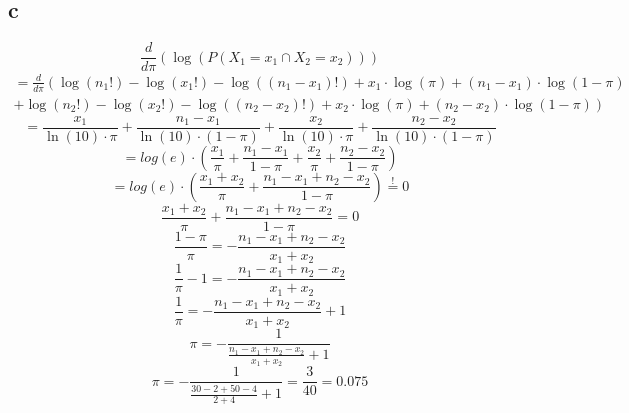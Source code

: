 \subsection{c}
\[ \frac{d}{d\pi}\left(\log(P(X_1=x_1 \cap X_2 = x_2))\right) \]
\[ \begin{array}{l} 
= \frac{d}{d\pi}\left( 
\log(n_1!) 
- \log(x_1!) 
- \log((n_1 - x_1)!) 
+ x_1 \cdot \log(\pi) 
+ (n_1 - x_1) \cdot \log(1-\pi) \right.\\\left.
+ \log(n_2!) 
- \log(x_2!) 
- \log((n_2 - x_2)!) 
+ x_2 \cdot \log(\pi) 
+ (n_2 - x_2) \cdot \log(1-\pi) \right)
\end{array} \]
%
\[ = \frac{x_1}{\ln(10) \cdot \pi} + \frac{n_1 - x_1}{\ln(10) \cdot (1 - \pi)}
+ \frac{x_2}{\ln(10) \cdot \pi} + \frac{n_2 - x_2}{\ln(10) \cdot (1 - \pi)} \]
\[ = log(e) \cdot \left( 
\frac{x_1}{\pi} 
+ \frac{n_1 - x_1}{1 - \pi}
+ \frac{x_2}{\pi} 
+ \frac{n_2 - x_2}{1 - \pi} \right) \]
\[ = log(e) \cdot \left( 
\frac{x_1 + x_2}{\pi} 
+ \frac{n_1 - x_1 + n_2 - x_2}{1 - \pi} \right) \stackrel{!}{=} 0 \]
\[ \frac{x_1 + x_2}{\pi} + \frac{n_1 - x_1 + n_2 - x_2}{1 - \pi} = 0 \]
\[ \frac{1 - \pi}{\pi} = - \frac{n_1 - x_1 + n_2 - x_2}{x_1 + x_2} \]
\[ \frac{1}{\pi} -1 = - \frac{n_1 - x_1 + n_2 - x_2}{x_1 + x_2} \]
\[ \frac{1}{\pi} = - \frac{n_1 - x_1 + n_2 - x_2}{x_1 + x_2} + 1 \]
\[ \pi = -\frac{1}{\frac{n_1 - x_1 + n_2 - x_2}{x_1 + x_2} + 1} \]
\[ \pi = -\frac{1}{\frac{30 - 2 + 50 - 4}{2 + 4} + 1} = \frac{3}{40} = 0.075 \]
